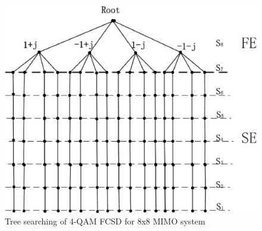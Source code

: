 \documentclass[12pt,a4paper,final]{article}
\begin{document}
\begin{spacing}{2.5}
\begin{figure}[tb]
\includegraphics[scale=0.5]{FCSD_tree_searching.eps}
\caption{Tree searching of 4-QAM FCSD for 8x8 MIMO system}
\label{figure4}
\end{figure}

\end{spacing}
\end{document}
